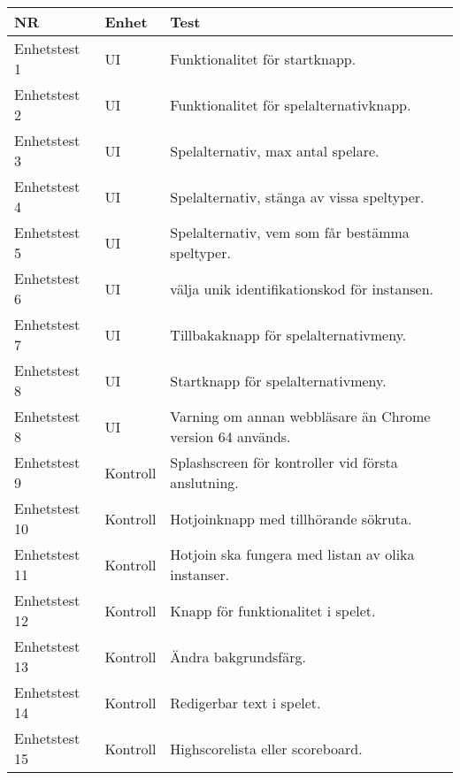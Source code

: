 	\begin{tabular}{| p{2.1cm}| p{2cm} | p{8cm}|}

      \hline
      NR&Enhet&Test\\
      \hline

		Enhetstest 1&UI&Funktionalitet för startknapp.\\
		\hline
		Enhetstest 2&UI&Funktionalitet för spelalternativknapp.\\
		\hline
		Enhetstest 3&UI&Spelalternativ, max antal spelare.\\
		\hline
		Enhetstest 4&UI&Spelalternativ, stänga av vissa speltyper.\\
		\hline
		Enhetstest 5&UI&Spelalternativ, vem som får bestämma speltyper.\\
		\hline
		Enhetstest 6&UI&välja unik identifikationskod för instansen.\\
		\hline
		Enhetstest 7&UI&Tillbakaknapp för spelalternativmeny.\\
		\hline
		Enhetstest 8&UI&Startknapp för spelalternativmeny.\\
		\hline
		Enhetstest 8&UI&Varning om annan webbläsare än Chrome version 64 används.\\
		\hline
		Enhetstest 9&Kontroll&Splashscreen för kontroller vid första anslutning.\\
		\hline
		Enhetstest 10&Kontroll&Hotjoinknapp med tillhörande sökruta.\\
		\hline
		Enhetstest 11&Kontroll&Hotjoin ska fungera med listan av olika instanser.\\
		\hline
		Enhetstest 12&Kontroll&Knapp för funktionalitet i spelet.\\
		\hline
		Enhetstest 13&Kontroll&Ändra bakgrundsfärg.\\
		\hline
		Enhetstest 14&Kontroll&Redigerbar text i spelet.\\
		\hline
		Enhetstest 15&Kontroll&Highscorelista eller scoreboard.\\
		\hline




  \end{tabular}

